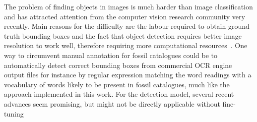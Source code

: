 \documentclass[english,twoside,openright]{UH_DS_MSc}
\begin{document}
The problem of finding objects in images is much harder than image classification and has attracted attention 
from the computer vision research community very recently. 
Main reasons for the difficulty are the labour required to obtain ground truth bounding boxes and 
the fact that object detection requires better image resolution to work well, therefore requiring more computational resources~\cite{ruotsalainen2024}.
One way to circumvent manual annotation for fossil catalogues could be to automatically detect correct bounding boxes 
from commercial OCR engine output files for instance by regular expression matching the word readings with a vocabulary of words likely to be 
present in fossil catalogues, much like the approach implemented in this work.
For the detection model, several recent advances seem promising, but might not be directly applicable without fine-tuning 
\end{document}
